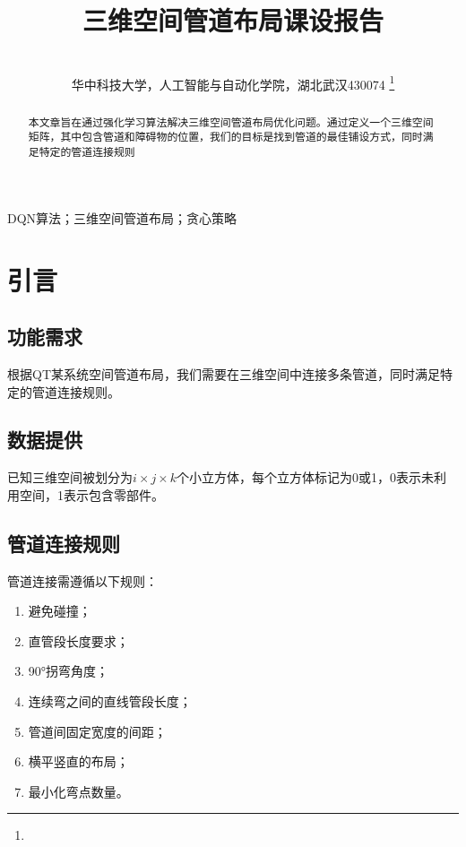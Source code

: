 \documentclass[lettersize,journal]{IEEEtran}
\begin{document}
	
	
\title{三维空间管道布局课设报告}
\author{\\华中科技大学，人工智能与自动化学院，湖北武汉430074
\thanks{}}
	
	
\maketitle
	
\begin{abstract}
本文章旨在通过强化学习算法解决三维空间管道布局优化问题。通过定义一个三维空间矩阵，其中包含管道和障碍物的位置，我们的目标是找到管道的最佳铺设方式，同时满足特定的管道连接规则
\end{abstract}
	
\begin{IEEEkeywords}
DQN算法；三维空间管道布局；贪心策略
\end{IEEEkeywords}
	
	
\section{引言}
\subsection{功能需求}
根据QT某系统空间管道布局，我们需要在三维空间中连接多条管道，同时满足特定的管道连接规则。

\subsection{数据提供}
已知三维空间被划分为$i \times j \times k$个小立方体，每个立方体标记为0或1，0表示未利用空间，1表示包含零部件。

\subsection{管道连接规则}
管道连接需遵循以下规则：
\begin{enumerate}
	\item 避免碰撞；
	\item 直管段长度要求；
	\item 90°拐弯角度；
	\item 连续弯之间的直线管段长度；
	\item 管道间固定宽度的间距；
	\item 横平竖直的布局；
	\item 最小化弯点数量。
\end{enumerate}
\end{document}
